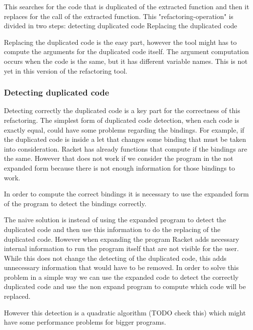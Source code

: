 This searches for the code that is duplicated of the extracted function and then it replaces for the call of the
extracted function.
This "refactoring-operation" is divided in two steps:
detecting duplicated code
Replacing the duplicated code

Replacing the duplicated code is the easy part, however the tool might has to compute
the arguments for the duplicated code itself. The argument computation occurs when
the code is the same, but it has different variable names. This is not yet in this
version of the refactoring tool.

\subsubsection{Detecting duplicated code}
Detecting correctly the duplicated code is a key part for the correctness of this refactoring.
The simplest form of duplicated code detection, when each code is exactly equal,
could have some problems regarding the bindings.
For example, if the duplicated code is inside a let that changes some binding that must
be taken into consideration.
Racket has already functions that compute if the bindings are the same.
However that does not work if we consider the program in the not expanded
form because there is not enough information for those bindings to work.


In order to compute the correct bindings it is necessary to use the expanded form
of the program to detect the bindings correctly.

The naive solution is instead of using the expanded program to detect the duplicated
 code and then use this information to do the replacing of the duplicated code.
However when expanding the program Racket adds necessary internal information to
run the program itself that are not visible for the user.
While this does not change the detecting of the duplicated code, this adds unnecessary information
that would have to be removed.
In order to solve this problem in a simple way we can use the expanded code to detect
the correctly duplicated code and use the non expand program
to compute which code will be replaced.

However this detection is a quadratic algorithm (TODO check this) which might
have some performance problems for bigger programs.

